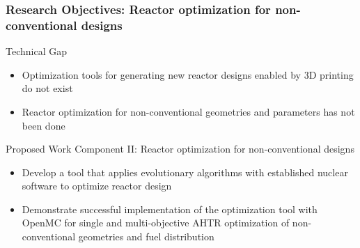 \begin{frame}
    \frametitle{Research Objectives: Reactor optimization for non-conventional designs}
    \begin{block}{Technical Gap}
      \begin{itemize}
        \item Optimization tools for generating new reactor designs enabled by
        3D printing do not exist
        \item Reactor optimization for non-conventional geometries and parameters 
        has not been done 
      \end{itemize}
    \end{block}
    \begin{block}{Proposed Work Component II: Reactor optimization for
      non-conventional designs}
        \begin{itemize}
            \item Develop a tool that applies evolutionary algorithms with established 
            nuclear software to optimize reactor design
            \item Demonstrate successful implementation of the optimization tool 
            with OpenMC for single and multi-objective AHTR optimization of 
            non-conventional geometries and fuel distribution
        \end{itemize}
    \end{block}
  \end{frame}
